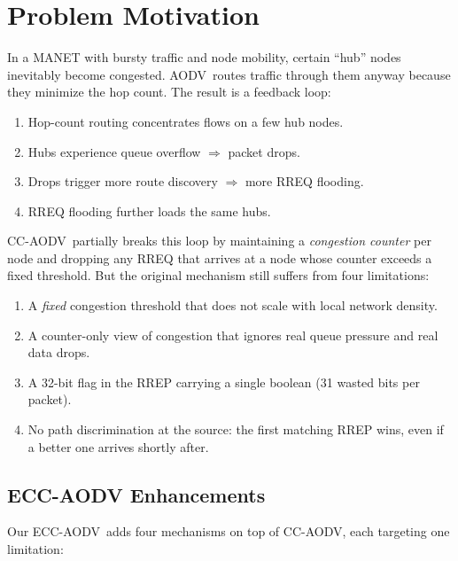 \documentclass[11pt,a4paper]{article}
\newcommand{\ecc}{ECC-AODV}
\newcommand{\cca}{CC-AODV}
\newcommand{\aodv}{AODV}
\begin{document}
\section{Problem Motivation}

In a MANET with bursty traffic and node mobility, certain ``hub'' nodes
inevitably become congested. \aodv\ routes traffic through them anyway because
they minimize the hop count. The result is a feedback loop:

\begin{enumerate}
    \item Hop-count routing concentrates flows on a few hub nodes.
    \item Hubs experience queue overflow $\Rightarrow$ packet drops.
    \item Drops trigger more route discovery $\Rightarrow$ more RREQ flooding.
    \item RREQ flooding further loads the same hubs.
\end{enumerate}

\cca\ partially breaks this loop by maintaining a \textit{congestion counter}
per node and dropping any RREQ that arrives at a node whose counter exceeds
a fixed threshold. But the original mechanism still suffers from four
limitations:

\begin{enumerate}
    \item A \emph{fixed} congestion threshold that does not scale with local
          network density.
    \item A counter-only view of congestion that ignores real queue pressure
          and real data drops.
    \item A 32-bit flag in the RREP carrying a single boolean
          (31 wasted bits per packet).
    \item No path discrimination at the source: the first matching RREP wins,
          even if a better one arrives shortly after.
\end{enumerate}

\subsection{ECC-AODV Enhancements}
\label{sec:eccfeatures}

Our \ecc\ adds four mechanisms on top of \cca, each targeting one limitation:
\end{document}
